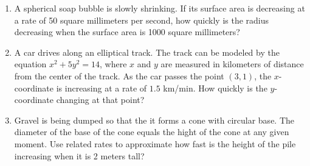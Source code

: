 \begin{enumerate}[ref={\fcProblemRef}]
\item \label{problemRelatedRatesFinddr/dtIfds/dtIsKnownS-sphere} A spherical soap bubble is slowly shrinking. If its surface area is decreasing at a rate of 50 square millimeters per
second, how quickly is the radius decreasing when the surface area is 1000 square millimeters?


\item \label{problemRelatedRatesCarAlongEllipticalTrack}A car drives along an elliptical track. The track can be modeled by the equation $x^2 + 5y^2 = 14$, where $x$ and $y$ are 
measured in kilometers of distance from the center of the track. As the car passes the point $(3, 1)$, the $x$-coordinate is 
increasing at a rate of $1.5$ km/min. How quickly is the $y$-coordinate changing at that point?

\item Gravel is being dumped so that the it forms a cone with circular base. The diameter of the base of the cone equals the hight of the cone at any given moment. Use related rates to approximate how fast is the height of the pile increasing when it is 2 meters tall? 
\end{enumerate}